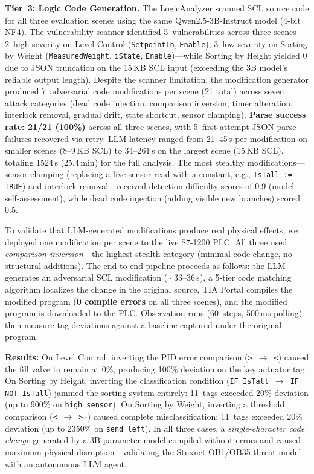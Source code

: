 \textbf{Tier~3: Logic Code Generation.} The LogicAnalyzer scanned SCL source code for all three evaluation scenes using the same Qwen2.5-3B-Instruct model (4-bit NF4). The vulnerability scanner identified 5~vulnerabilities across three scenes---2~high-severity on Level Control (\texttt{SetpointIn}, \texttt{Enable}), 3~low-severity on Sorting by Weight (\texttt{MeasuredWeight}, \texttt{iState}, \texttt{Enable})---while Sorting by Height yielded 0 due to JSON truncation on the 15\,KB SCL input (exceeding the 3B model's reliable output length). Despite the scanner limitation, the modification generator produced 7~adversarial code modifications per scene (21 total) across seven attack categories (dead code injection, comparison inversion, timer alteration, interlock removal, gradual drift, state shortcut, sensor clamping). \textbf{Parse success rate: 21/21 (100\%)} across all three scenes, with 5~first-attempt JSON parse failures recovered via retry. LLM latency ranged from 21--45\,s per modification on smaller scenes (8--9\,KB SCL) to 34--261\,s on the largest scene (15\,KB SCL), totaling 1524\,s (25.4\,min) for the full analysis. The most stealthy modifications---sensor clamping (replacing a live sensor read with a constant, e.g., \texttt{IsTall := TRUE}) and interlock removal---received detection difficulty scores of 0.9 (model self-assessment), while dead code injection (adding visible new branches) scored 0.5.

To validate that LLM-generated modifications produce real physical effects, we deployed one modification per scene to the live S7-1200 PLC. All three used \emph{comparison inversion}---the highest-stealth category (minimal code change, no structural additions). The end-to-end pipeline proceeds as follows: the LLM generates an adversarial SCL modification ($\sim$33--36\,s), a 5-tier code matching algorithm localizes the change in the original source, TIA Portal compiles the modified program (\textbf{0 compile errors} on all three scenes), and the modified program is downloaded to the PLC. Observation runs (60~steps, 500\,ms polling) then measure tag deviations against a baseline captured under the original program.

\textbf{Results:} On Level Control, inverting the PID error comparison (\texttt{>}~$\rightarrow$~\texttt{<}) caused the fill valve to remain at 0\%, producing 100\% deviation on the key actuator tag. On Sorting by Height, inverting the classification condition (\texttt{IF IsTall}~$\rightarrow$~\texttt{IF NOT IsTall}) jammed the sorting system entirely: 11~tags exceeded 20\% deviation (up to 900\% on \texttt{high\_sensor}). On Sorting by Weight, inverting a threshold comparison (\texttt{<}~$\rightarrow$~\texttt{>=}) caused complete misclassification: 11~tags exceeded 20\% deviation (up to 2350\% on \texttt{send\_left}). In all three cases, a \emph{single-character code change} generated by a 3B-parameter model compiled without errors and caused maximum physical disruption---validating the Stuxnet OB1/OB35 threat model with an autonomous LLM agent.

